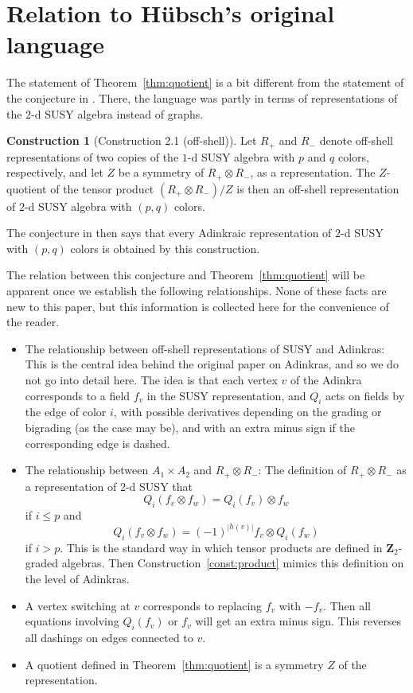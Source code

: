 \documentclass[12pt,twoside,singlespace]{article}
\numberwithin{equation}{section}
\theoremstyle{definition}
\newtheorem{construction}[equation]{Construction}
\newcommand{\ZZ}{\mathbf{Z}}
\begin{document}
\section{Relation to H\"ubsch's original language}
\label{app:repn}
The statement of Theorem~\ref{thm:quotient} is a bit different from the statement of the conjecture in \cite{hubsch:weaving}.  There, the language was partly in terms of representations of the $2$-d SUSY algebra instead of graphs.
\begin{construction}[Construction 2.1 (off-shell)] Let $R_+$ and $R_-$ denote off-shell representations of two copies of the $1$-d SUSY algebra with $p$ and $q$ colors, respectively, and let $Z$ be a symmetry of $R_+ \otimes R_-$, as a representation. The $Z$-quotient of the tensor product $(R_+ \otimes R_-)/Z$ is then an off-shell representation of $2$-d SUSY algebra with $(p,q)$ colors.
\end{construction}
The conjecture in \cite{hubsch:weaving} then says that every Adinkraic representation of $2$-d SUSY with $(p,q)$ colors is obtained by this construction.

The relation between this conjecture and Theorem~\ref{thm:quotient} will be apparent once we establish the following relationships.  None of these facts are new to this paper, but this information is collected here for the convenience of the reader.
\begin{itemize}
\item The relationship between off-shell representations of SUSY and Adinkras: This is the central idea behind the original paper on Adinkras\cite{d2l:first}, and so we do not go into detail here.  The idea is that each vertex $v$ of the Adinkra corresponds to a field $f_v$ in the SUSY representation, and $Q_i$ acts on fields by the edge of color $i$, with possible derivatives depending on the grading or bigrading (as the case may be), and with an extra minus sign if the corresponding edge is dashed.
\item The relationship between $A_1\times A_2$ and $R_+\otimes R_-$: The definition of $R_+\otimes R_-$ as a representation of $2$-d SUSY that
\[Q_i(f_v\otimes f_w)=Q_i(f_v)\otimes f_w \]
if $i\le p$ and
\[Q_i(f_v\otimes f_w)=(-1)^{|h(v)|}f_v\otimes Q_i(f_w)\]
if $i >p$.  This is the standard way in which tensor products are defined in $\ZZ_2$-graded algebras.\cite{bott_tu,freed}  Then Construction~\ref{const:product} mimics this definition on the level of Adinkras.
\item A vertex switching at $v$ corresponds to replacing $f_v$ with $-f_v$.  Then all equations involving $Q_i(f_v)$ or $f_v$ will get an extra minus sign.  This reverses all dashings on edges connected to $v$.
\item A quotient defined in Theorem~\ref{thm:quotient} is a symmetry $Z$ of the representation.
\end{itemize}



\end{document}
